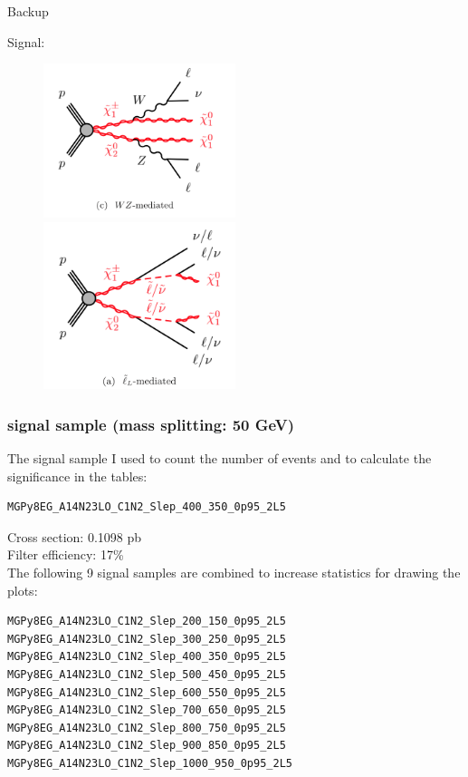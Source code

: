 \documentclass[mathserif,serif]{beamer}
\begin{document}
\begin{frame}
\begin{center}
\huge
Backup
\end{center}
\end{frame}

\begin{frame}
\small
Signal:\\
\begin{figure}
\includegraphics[width=0.5\textwidth]{data/WZ.png}
\includegraphics[width=0.5\textwidth]{data/slepton.png}
\end{figure}
\end{frame}

\begin{frame}[fragile]
\frametitle{signal sample (mass splitting: 50 GeV)}
\small
The signal sample I used to count the number of events and to calculate the significance in the tables:
\tiny
\begin{verbatim}
MGPy8EG_A14N23LO_C1N2_Slep_400_350_0p95_2L5
\end{verbatim}
\small
Cross section: 0.1098 pb \\
Filter efficiency: 17\% \\
\vspace{5mm}
The following 9 signal samples are combined to increase statistics for drawing the plots:
\tiny
\begin{verbatim}
MGPy8EG_A14N23LO_C1N2_Slep_200_150_0p95_2L5
MGPy8EG_A14N23LO_C1N2_Slep_300_250_0p95_2L5
MGPy8EG_A14N23LO_C1N2_Slep_400_350_0p95_2L5
MGPy8EG_A14N23LO_C1N2_Slep_500_450_0p95_2L5
MGPy8EG_A14N23LO_C1N2_Slep_600_550_0p95_2L5
MGPy8EG_A14N23LO_C1N2_Slep_700_650_0p95_2L5
MGPy8EG_A14N23LO_C1N2_Slep_800_750_0p95_2L5
MGPy8EG_A14N23LO_C1N2_Slep_900_850_0p95_2L5
MGPy8EG_A14N23LO_C1N2_Slep_1000_950_0p95_2L5
\end{verbatim}
\end{frame}
\end{document}
